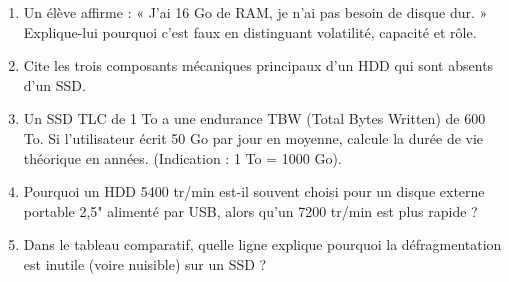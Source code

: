 \documentclass[11pt]{article}
\begin{document}
\begin{exercice}
\begin{enumerate}
    \item Un élève affirme : « J'ai 16 Go de RAM, je n'ai pas besoin de disque dur. » Explique-lui pourquoi c'est faux en distinguant volatilité, capacité et rôle.
    \item Cite les trois composants mécaniques principaux d'un HDD qui sont absents d'un SSD.
    \item Un SSD TLC de 1 To a une endurance TBW (Total Bytes Written) de 600 To. Si l'utilisateur écrit 50 Go par jour en moyenne, calcule la durée de vie théorique en années. (Indication : 1 To = 1000 Go).
    \item Pourquoi un HDD 5400 tr/min est-il souvent choisi pour un disque externe portable 2,5" alimenté par USB, alors qu'un 7200 tr/min est plus rapide ?
    \item Dans le tableau comparatif, quelle ligne explique pourquoi la défragmentation est inutile (voire nuisible) sur un SSD ?
\end{enumerate}
\end{exercice}
\end{document}
